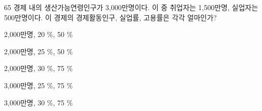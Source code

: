 \begin{question}{65}
경제 내의 생산가능연령인구가 3,000만명이다. 이 중 취업자는 1,500만명, 실업자는 500만명이다. 이 경제의 경제활동인구, 실업률, 고용률은 각각 얼마인가?
\begin{choices}
  \item 2,000만명, 20 \%, 50 \%
  \item 2,000만명, 25 \%, 50 \%
  \item 2,000만명, 30 \%, 75 \%
  \item 3,000만명, 25 \%, 75 \%
  \item 3,000만명, 30 \%, 75 \%
\end{choices}
\end{question}
